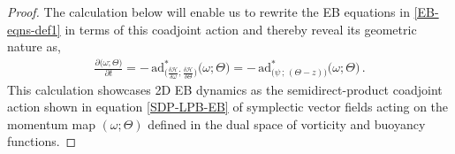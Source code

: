 \documentclass[11pt, oneside]{article}   	%
\numberwithin{equation}{section}
\theoremstyle{plain}
\theoremstyle{definition}
\theoremstyle{remark}
\newcommand{\<}{\langle}
\renewcommand{\>}{\rangle}
\begin{document}
\begin{proof}
The calculation below will enable us to rewrite the EB equations in \eqref{EB-eqns-def1} in terms of this coadjoint action and thereby reveal its geometric nature as,
\begin{align}
\frac{\partial \big(\omega ; \Theta\big)}{\partial t}
= - \,{\mathrm{ad}}^*_{\big(\frac{\delta \mathcal{H}}{\delta \omega};\frac{\delta \mathcal{H}}{\delta \Theta}\big)}
\big(\omega ; \Theta\big)
= - \,{\mathrm{ad}}^*_{\big(\psi\,;\, (\Theta -z)\big)}
\big(\omega ; \Theta\big)
\,.
\label{SDP-EB-LP-ad-star}
\end{align}
This calculation showcases 2D EB dynamics as the semidirect-product coadjoint action shown in equation \eqref{SDP-LPB-EB} of symplectic vector fields acting on the momentum map $(\omega ; \Theta)$ defined in the dual space of vorticity and buoyancy functions. 


\end{proof}
\end{document}
